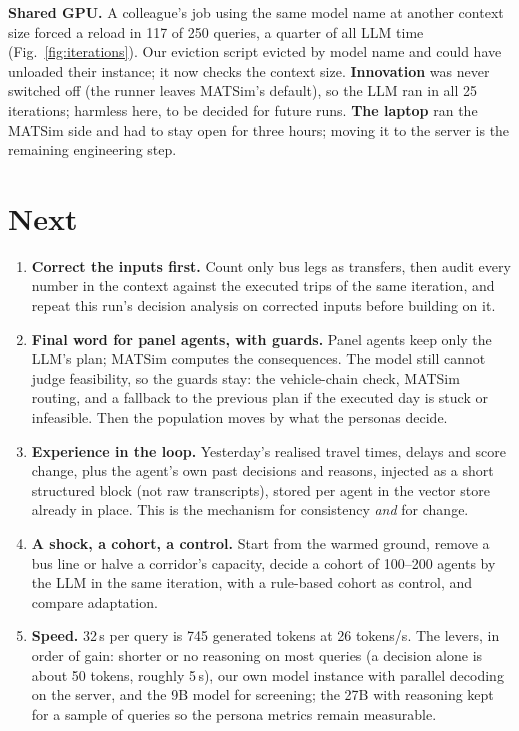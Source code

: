 \documentclass[10pt,a4paper]{article}
\begin{document}
\textbf{Shared GPU.} A colleague's job using the same model name at another context size forced a reload in 117 of 250 queries, a quarter of all LLM time (Fig.~\ref{fig:iterations}). Our eviction script evicted by model name and could have unloaded their instance; it now checks the context size. \textbf{Innovation} was never switched off (the runner leaves MATSim's default), so the LLM ran in all 25 iterations; harmless here, to be decided for future runs. \textbf{The laptop} ran the MATSim side and had to stay open for three hours; moving it to the server is the remaining engineering step.

\section{Next}
\begin{enumerate}\setlength{\itemsep}{1pt}
\item \textbf{Correct the inputs first.} Count only bus legs as transfers, then audit every number in the context against the executed trips of the same iteration, and repeat this run's decision analysis on corrected inputs before building on it.
\item \textbf{Final word for panel agents, with guards.} Panel agents keep only the LLM's plan; MATSim computes the consequences. The model still cannot judge feasibility, so the guards stay: the vehicle-chain check, MATSim routing, and a fallback to the previous plan if the executed day is stuck or infeasible. Then the population moves by what the personas decide.
\item \textbf{Experience in the loop.} Yesterday's realised travel times, delays and score change, plus the agent's own past decisions and reasons, injected as a short structured block (not raw transcripts), stored per agent in the vector store already in place. This is the mechanism for consistency \emph{and} for change.
\item \textbf{A shock, a cohort, a control.} Start from the warmed ground, remove a bus line or halve a corridor's capacity, decide a cohort of 100--200 agents by the LLM in the same iteration, with a rule-based cohort as control, and compare adaptation.
\item \textbf{Speed.} 32\,s per query is 745 generated tokens at 26 tokens/s. The levers, in order of gain: shorter or no reasoning on most queries (a decision alone is about 50 tokens, roughly 5\,s), our own model instance with parallel decoding on the server, and the 9B model for screening; the 27B with reasoning kept for a sample of queries so the persona metrics remain measurable.
\end{enumerate}
\end{document}
